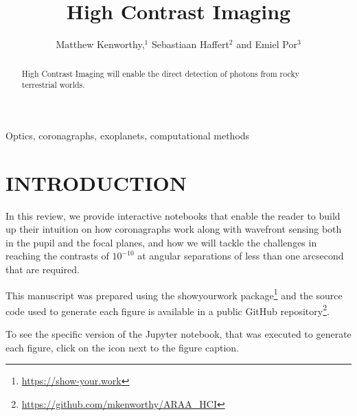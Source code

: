 \documentclass[letterpaper]{ar-1col}
\newcommand{\project}[1]{\textsf{#1}}
\begin{document}


\title{High Contrast Imaging}

\author{Matthew Kenworthy,$^1$ Sebastiaan Haffert$^2$ and Emiel Por$^3$
  }

\begin{abstract}
High Contrast Imaging will enable the direct detection of photons from rocky terrestrial worlds.
\end{abstract}

\begin{keywords}
 Optics, coronagraphs, exoplanets, computational methods

\end{keywords}
\maketitle

\tableofcontents

\section{INTRODUCTION}
\label{sec:intro}



In this review, we provide interactive notebooks that enable the reader to build up their intuition on how coronagraphs work along with wavefront sensing both in the pupil and the focal planes, and how we will tackle the challenges in reaching the contrasts of $10^{-10}$ at angular separations of less than one arcsecond that are required.

This manuscript was prepared using the \project{showyourwork} package\footnote{\url{https://show-your.work}} and the source code used to generate each figure is available in a public \project{GitHub} repository\footnote{\url{https://github.com/mkenworthy/ARAA_HCI}}.

To see the specific version of the \project{Jupyter} notebook, that was executed to generate each figure, click on the icon next to the figure caption.
\end{document}
